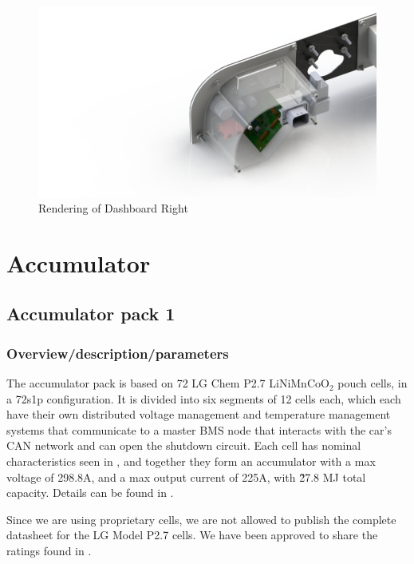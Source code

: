 \documentclass{article}
\begin{document}
\begin{figure}[H]
\centering
	\includegraphics[width=0.6\linewidth]{dashboard_right}
	\caption{Rendering of Dashboard Right}
	\label{dashboard_right}
\end{figure}

\section{Accumulator}\label{accumulator}
\subsection{Accumulator pack 1}\label{accumulator_pack_1}
\subsubsection{Overview/description/parameters}\label{accumulator_overview}

The accumulator pack is based on 72 LG Chem P2.7 LiNiMnCoO$_{2}$ pouch cells, in a 72s1p configuration. It is divided into six segments of 12 cells each, which each have their own distributed voltage management and temperature management systems that communicate to a master BMS node that interacts with the car's CAN network and can open the shutdown circuit. Each cell has nominal characteristics seen in , and together they form an accumulator with a max voltage of 298.8A, and a max output current of 225A, with \~27.8 MJ total capacity. Details can be found in . 

Since we are using proprietary cells, we are not allowed to publish the complete datasheet for the LG Model P2.7 cells. We have been approved to share the ratings found in . 
\end{document}
